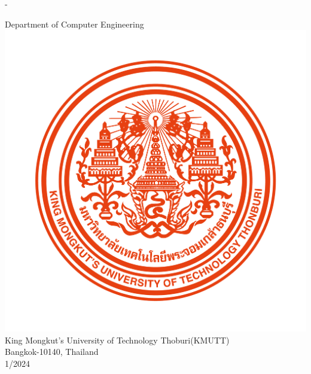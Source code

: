 \begin{titlingpage}
\begin{SingleSpace}
\begin{adjustwidth*}{\unitlength}{-\unitlength}
\begin{center}
				{\large {Department of Computer Engineering}}\\
				\vspace{12mm}
				\includegraphics[scale=0.3]{frontmatter/KMUTT_CI.png} \\[0.25cm]
				\vspace{12mm}
				{\large King Mongkut's University of Technology Thoburi(KMUTT)}\\
				{\large Bangkok-10140, Thailand}\\
				{\large 1/2024}\\
			\end{center}
		\end{adjustwidth*}
	\end{SingleSpace}
\end{titlingpage}